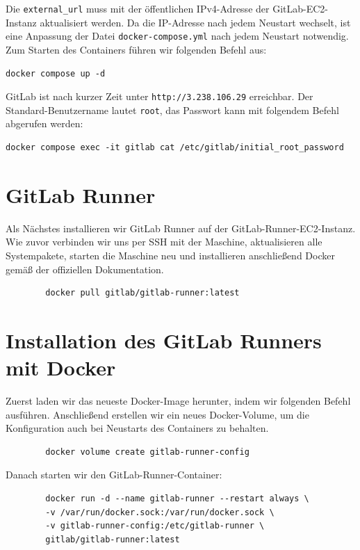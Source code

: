 \documentclass[a4paper,12pt]{article}
\begin{document}
Die \texttt{external\_url} muss mit der öffentlichen IPv4-Adresse der GitLab-EC2-Instanz aktualisiert werden. Da die IP-Adresse nach jedem Neustart wechselt, ist eine Anpassung der Datei \texttt{docker-compose.yml} nach jedem Neustart notwendig.
Zum Starten des Containers führen wir folgenden Befehl aus:

\begin{verbatim}
docker compose up -d
\end{verbatim}

GitLab ist nach kurzer Zeit unter \texttt{http://3.238.106.29} erreichbar. Der Standard-Benutzername lautet \texttt{root}, das Passwort kann mit folgendem Befehl abgerufen werden:

\begin{verbatim}
docker compose exec -it gitlab cat /etc/gitlab/initial_root_password
\end{verbatim}







\section{GitLab Runner}
Als Nächstes installieren wir GitLab Runner auf der GitLab-Runner-EC2-Instanz.  
Wie zuvor verbinden wir uns per SSH mit der Maschine, aktualisieren alle Systempakete, starten die Maschine neu und installieren anschließend Docker gemäß der offiziellen Dokumentation.

\begin{verbatim}
    	docker pull gitlab/gitlab-runner:latest
\end{verbatim}

\section{Installation des GitLab Runners mit Docker}
Zuerst laden wir das neueste Docker-Image herunter, indem wir folgenden Befehl ausführen.  
Anschließend erstellen wir ein neues Docker-Volume, um die Konfiguration auch bei Neustarts des Containers zu behalten.

\begin{verbatim}
		docker volume create gitlab-runner-config
\end{verbatim}

Danach starten wir den GitLab-Runner-Container:

\begin{verbatim}
		docker run -d --name gitlab-runner --restart always \
		-v /var/run/docker.sock:/var/run/docker.sock \
		-v gitlab-runner-config:/etc/gitlab-runner \
		gitlab/gitlab-runner:latest
\end{verbatim}
\end{document}
